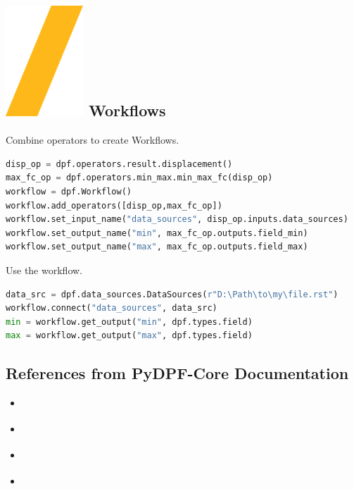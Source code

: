 \documentclass[9pt,landscape]{article}
\begin{document}
\begin{multicols}{3}
\section{\includegraphics[height=\fontcharht\font`\S]{slash.png} Workflows }
Combine operators to create Workflows.
\begin{lstlisting}[language=Python]
disp_op = dpf.operators.result.displacement()
max_fc_op = dpf.operators.min_max.min_max_fc(disp_op)
workflow = dpf.Workflow()
workflow.add_operators([disp_op,max_fc_op])
workflow.set_input_name("data_sources", disp_op.inputs.data_sources)
workflow.set_output_name("min", max_fc_op.outputs.field_min)
workflow.set_output_name("max", max_fc_op.outputs.field_max)
\end{lstlisting}

Use the workflow.
\begin{lstlisting}[language=Python]
data_src = dpf.data_sources.DataSources(r"D:\Path\to\my\file.rst")
workflow.connect("data_sources", data_src)
min = workflow.get_output("min", dpf.types.field)
max = workflow.get_output("max", dpf.types.field)
\end{lstlisting}



\subsection{References from PyDPF-Core Documentation}
\begin{itemize}
\item \href{https://dpf.docs.pyansys.com/version/stable/getting_started/index.html}{\color{blue}{Getting Started}}
\item \href{https://dpf.docs.pyansys.com/version/stable/examples/index.html}{\color{blue}{Examples}}
\item \href{https://dpf.docs.pyansys.com/version/stable/api/index.html}{\color{blue}{API Reference}}
\item \href{https://dpf.docs.pyansys.com/version/stable/operator_reference.html}{\color{blue}{Operators Reference}}
\end{itemize}
\end{multicols}
\end{document}
